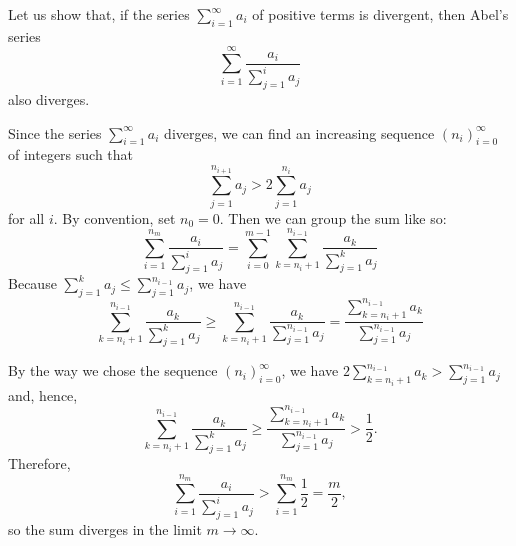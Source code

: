 \documentclass[12pt]{article}
\begin{document}
Let us show that, if the series $\sum_{i=1}^\infty a_i$ of positive terms is divergent, then Abel's series
 \[ \sum_{i=1}^\infty \frac{a_i}{\sum_{j=1}^i a_j} \]
also diverges.

Since the series $\sum_{i=1}^\infty a_i$ diverges, we can find an increasing sequence $(n_i)_{i=0}^\infty$ of integers such that
 \[ \sum_{j=1}^{n_{i+1}} a_j > 2 \sum_{j=1}^{n_i} a_j \]
for all $i$.  By convention, set $n_0 = 0$.  Then we can group the sum like so:
 \[ \sum_{i=1}^{n_m} \frac{a_i}{\sum_{j=1}^i a_j} = \sum_{i=0}^{m-1} \sum_{k=n_i+1}^{n_{i-1}} \frac{a_k}{\sum_{j=1}^k a_j} \]
Because $\sum_{j=1}^k a_j \le \sum_{j=1}^{n_{i-1}} a_j$, we have
 \[ \sum_{k=n_i+1}^{n_{i-1}} \frac{a_k}{\sum_{j=1}^k a_j} \ge \sum_{k=n_i+1}^{n_{i-1}} \frac{a_k}{\sum_{j=1}^{n_{i-1}} a_j} = 
\frac{\sum_{k=n_i+1}^{n_{i-1}} a_k}{\sum_{j=1}^{n_{i-1}} a_j} \]

By the way we chose the sequence $(n_i)_{i=0}^\infty$, we have $2 \sum_{k=n_i+1}^{n_{i-1}} a_k > \sum_{j=1}^{n_{i-1}} a_j$ and, hence,
 \[ \sum_{k=n_i+1}^{n_{i-1}} \frac{a_k}{\sum_{j=1}^k a_j} \ge \frac{\sum_{k=n_i+1}^{n_{i-1}} a_k}{\sum_{j=1}^{n_{i-1}} a_j} > \frac{1}{2}. \]
Therefore,
 \[ \sum_{i=1}^{n_m} \frac{a_i}{\sum_{j=1}^i a_j} > \sum_{i=1}^{n_m} \frac{1}{2} = \frac{m}{2}, \]
so the sum diverges in the limit $m \to \infty$.
\end{document}
